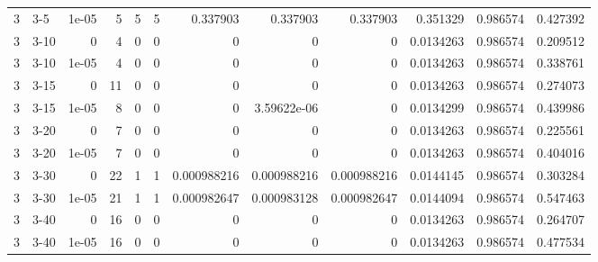 \begin{tabular}{rlrrrrrrrrrr}
     3 & 3-5    &      1e-05 &           5 &                 5 &                 5 &     0.337903    &     0.337903    &      0.337903    &        0.351329  &               0.986574 &           0.427392 \\
     3 & 3-10   &      0     &           4 &                 0 &                 0 &     0           &     0           &      0           &        0.0134263 &               0.986574 &           0.209512 \\
     3 & 3-10   &      1e-05 &           4 &                 0 &                 0 &     0           &     0           &      0           &        0.0134263 &               0.986574 &           0.338761 \\
     3 & 3-15   &      0     &          11 &                 0 &                 0 &     0           &     0           &      0           &        0.0134263 &               0.986574 &           0.274073 \\
     3 & 3-15   &      1e-05 &           8 &                 0 &                 0 &     0           &     3.59622e-06 &      0           &        0.0134299 &               0.986574 &           0.439986 \\
     3 & 3-20   &      0     &           7 &                 0 &                 0 &     0           &     0           &      0           &        0.0134263 &               0.986574 &           0.225561 \\
     3 & 3-20   &      1e-05 &           7 &                 0 &                 0 &     0           &     0           &      0           &        0.0134263 &               0.986574 &           0.404016 \\
     3 & 3-30   &      0     &          22 &                 1 &                 1 &     0.000988216 &     0.000988216 &      0.000988216 &        0.0144145 &               0.986574 &           0.303284 \\
     3 & 3-30   &      1e-05 &          21 &                 1 &                 1 &     0.000982647 &     0.000983128 &      0.000982647 &        0.0144094 &               0.986574 &           0.547463 \\
     3 & 3-40   &      0     &          16 &                 0 &                 0 &     0           &     0           &      0           &        0.0134263 &               0.986574 &           0.264707 \\
     3 & 3-40   &      1e-05 &          16 &                 0 &                 0 &     0           &     0           &      0           &        0.0134263 &               0.986574 &           0.477534 \\

\end{tabular}
